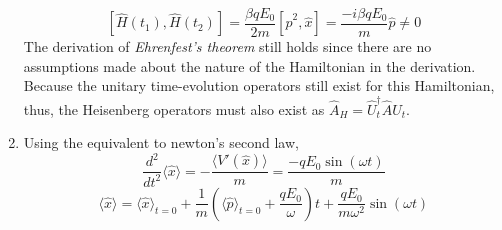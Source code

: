 \begin{sol}
\begin{enumerate}[label=\textbf{(\alph*)}]
$$[\hat H(t_1),\hat H(t_2)]=\frac{\beta qE_0}{2m}[\hat p^2,\hat x]=\frac{-i\beta qE_0}{m}\hat p\neq 0$$ 
The derivation of \textit{Ehrenfest's theorem} still holds since there are no assumptions made about the nature of the Hamiltonian in the derivation. Because the unitary time-evolution operators still exist for this Hamiltonian, thus, the Heisenberg operators must also exist as $\hat A_H=\hat U_t^\dagger\hat A\hat U_t$.
\item
Using the equivalent to newton's second law, 
$$\frac{d^2}{dt^2}\langle\hat x\rangle=-\frac{\langle V'(\hat x)\rangle}{m}=\frac{-qE_0\sin(\omega t)}{m}$$
$$\langle\hat x\rangle=\langle\hat x\rangle_{t=0}+\frac{1}{m}\left(\langle\hat p\rangle_{t=0}+\frac{qE_0}{\omega}\right)t+\frac{qE_0}{m\omega^2}\sin(\omega t)$$
\end{enumerate}
\end{sol}
